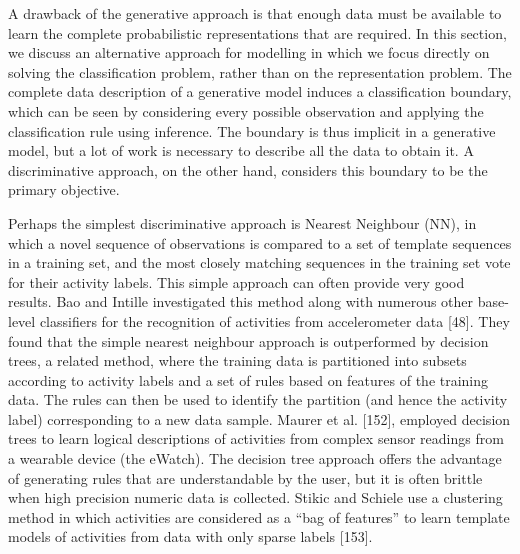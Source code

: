 A drawback of the generative approach is that enough data must be available to learn the complete probabilistic representations that are required. In this section, we discuss an alternative approach for modelling in which we focus directly on solving the classification problem, rather than on the representation problem. The complete data description of a generative model induces a classification boundary, which can be seen by considering every possible observation and applying the classification rule using inference. The boundary is thus implicit in a generative model, but a lot of work is necessary to describe all the data to obtain it. A discriminative approach, on the other hand, considers this boundary to be the primary objective.

Perhaps the simplest discriminative approach is Nearest Neighbour (NN), in which a novel sequence of observations is compared to a set of template sequences in a training set, and the most closely matching sequences in the training set vote for their activity labels. This simple approach can often provide very good results. Bao and Intille investigated this method along with numerous other base-level classifiers for the recognition of activities from accelerometer data [48]. They found that the simple nearest neighbour approach is outperformed by decision trees, a related method, where the training data is partitioned into subsets according to activity labels and a set of rules based on features of the training data. The rules can then be used to identify the partition (and hence the activity label) corresponding to a new data sample. Maurer et al. [152], employed decision trees to learn logical descriptions of activities from complex sensor readings from a wearable device (the eWatch). The decision tree approach offers the advantage of generating rules that are understandable by the user, but it is often brittle when high precision numeric data is collected. Stikic and Schiele use a clustering method in which activities are considered as a “bag of features” to learn template models of activities from data with only sparse labels [153]. 

